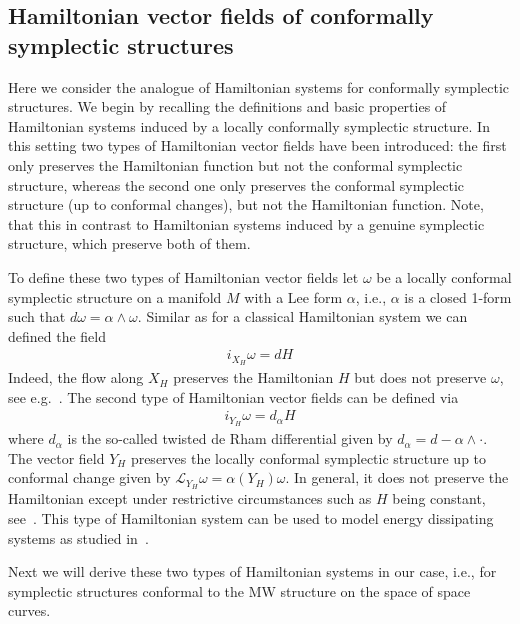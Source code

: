 \documentclass[12pt]{amsart}
\newcommand{\rev}[1]{#1}
\theoremstyle{definition}
\def\L{\mathcal{L}}
\begin{document}
\rev{
\subsection{Hamiltonian vector fields of conformally symplectic structures}\label{sec:Hamiltonian_flow_locally_conformal}
Here we consider the analogue of Hamiltonian systems for conformally symplectic structures. 
We begin by recalling the definitions and basic properties of Hamiltonian systems induced by a locally conformally symplectic structure. In this setting  two types of Hamiltonian vector fields have been introduced: the first only preserves the Hamiltonian function but not  the conformal symplectic structure, whereas the second one only preserves the conformal symplectic structure (up to conformal changes), but not the Hamiltonian function. Note, that this in contrast to Hamiltonian systems induced by a genuine symplectic structure, which preserve both of them.

To define these two types of Hamiltonian vector fields let $\omega$ be a locally conformal symplectic structure on a manifold $M$ with a Lee form $\alpha$, i.e., $\alpha$ is a closed 1-form such that $d\omega=\alpha\wedge \omega$. Similar as for a classical Hamiltonian system we can defined the field
\begin{align}
    i_{X_H}\omega = dH
\end{align}
Indeed, the flow along $X_H$ preserves the Hamiltonian $H$ but does not preserve $\omega$, 
see e.g.~\cite{wojtkowski1998conformallyDynamics}.
The second type of Hamiltonian vector fields can be defined via
\begin{align}
    i_{Y_H}\omega = d_{\alpha}H
\end{align}
where $d_\alpha$ is the so-called twisted de Rham differential given by $d_\alpha=d-\alpha\wedge \cdot$. The vector field $Y_H$ preserves the locally conformal symplectic structure up to conformal change given by $\L_{Y_H}\omega=\alpha(Y_H)\omega$. In general, it does not preserve the Hamiltonian except under restrictive circumstances such as $H$ being constant, see~\cite{vaisman1985locally,maro2017aubry}. This type of Hamiltonian system can be used to model energy dissipating systems as studied in~\cite{allais2024conformalDampingDynamics, bhatt2016secondOrderConformal}. 

Next we will derive these two types of Hamiltonian systems in our case, i.e., for symplectic structures conformal to the MW structure on the space of space curves.

}
\end{document}
